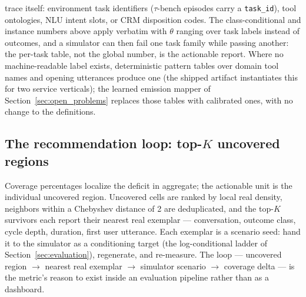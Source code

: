 trace itself: environment task identifiers ($\tau$-bench episodes carry a \texttt{task\_id}),
tool ontologies, NLU intent slots, or CRM disposition codes. The class-conditional and
instance numbers above apply verbatim with $\theta$ ranging over task labels instead of
outcomes, and a simulator can then fail one task family while passing another: the per-task
table, not the global number, is the actionable report. Where no machine-readable label
exists, deterministic pattern tables over domain tool names and opening utterances produce
one (the shipped artifact instantiates this for two service verticals); the learned emission
mapper of Section~\ref{sec:open_problems} replaces those tables with calibrated ones, with
no change to the definitions.

\subsection{The recommendation loop: top-$K$ uncovered regions}
Coverage percentages localize the deficit in aggregate; the actionable unit is the individual
uncovered region.
Uncovered cells are ranked by local real density, neighbors within a Chebyshev distance of 2
are deduplicated, and the top-$K$ survivors each report their nearest real exemplar ---
conversation, outcome class, cycle depth, duration, first user utterance.
Each exemplar is a scenario seed: hand it to the simulator as a conditioning target (the
log-conditional ladder of Section~\ref{sec:evaluation}), regenerate, and re-measure.
The loop --- uncovered region $\to$ nearest real exemplar $\to$ simulator scenario $\to$
coverage delta --- is the metric's reason to exist inside an evaluation pipeline rather than
as a dashboard.
